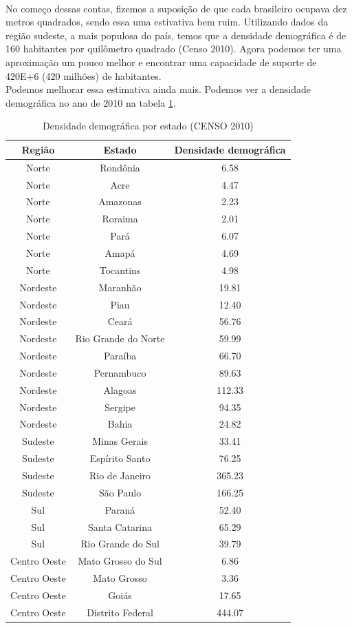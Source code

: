 \documentclass[a4paper]{article}
\begin{document}
\\
No come\c{c}o dessas contas, fizemos a suposi\c{c}\~{a}o de que cada brasileiro ocupava dez metros quadrados, sendo essa uma estivativa bem ruim. Utilizando dados da regi\~{a}o sudeste, a mais populosa do pa\'{i}s, temos que a densidade demogr\'{a}fica \'{e} de 160 habitantes por quil\^{o}metro quadrado (Censo 2010). Agora podemos ter uma aproxima\c{c}\~{a}o um pouco melhor e encontrar uma capacidade de suporte de 420E+6 (420 milh\~{o}es) de habitantes.
\\
Podemos melhorar essa estimativa ainda mais. Podemos ver a densidade demogr\'{a}fica no ano de 2010 na tabela \ref{tabelaCensoDem2010}.
\\
\begin{table}[ht!]
\centering
\caption{Densidade demogr\'{a}fica por estado (CENSO 2010)}
\label{tabelaCensoDem2010}
\begin{tabular}{c|c|c}
Regi\~{a}o		&	Estado				&	Densidade demogr\'{a}fica\\
\hline
Norte		&	Rond\^{o}nia		& 	6.58		\\
Norte		&	Acre			&	4.47		\\
Norte		&	Amazonas 		&	2.23		\\
Norte		&	Roraima			&	2.01		\\
Norte		&	Par\'{a} 		&	6.07		\\
Norte		&	Amap\'{a}		&	4.69		\\
Norte		&	Tocantins		&	4.98		\\
Nordeste	&	Maranh\~{a}o 		&	19.81 		\\
Nordeste	&	Piau			&	12.40		\\
Nordeste	&	Cear\'{a}		&	56.76 		\\
Nordeste	&	Rio Grande do Norte	&	59.99 		\\
Nordeste	&	Para\'{i}ba		&	66.70 		\\
Nordeste	&	Pernambuco		&	89.63 		\\
Nordeste	&	Alagoas			&	112.33		\\
Nordeste	&	Sergipe			&	94.35		\\
Nordeste	&	Bahia			&	24.82		\\
Sudeste		&	Minas Gerais		&	33.41 		\\
Sudeste		&	Esp\'{i}rito Santo	&	76.25 		\\
Sudeste		&	Rio de Janeiro		&	365.23  	\\
Sudeste		&	S\~{a}o Paulo		&	166.25  	\\
Sul		&	Paran\'{a}		&	52.40		\\
Sul		&	Santa Catarina		&	65.29		\\
Sul		&	Rio Grande do Sul	&	39.79		\\	
Centro Oeste	& 	Mato Grosso do Sul	&	6.86   		\\
Centro Oeste	& 	Mato Grosso		&	3.36   		\\
Centro Oeste	& 	Goi\'{a}s		&	17.65  		\\
Centro Oeste	& 	Distrito Federal	&	444.07	
\end{tabular}
\end{table}
\end{document}
